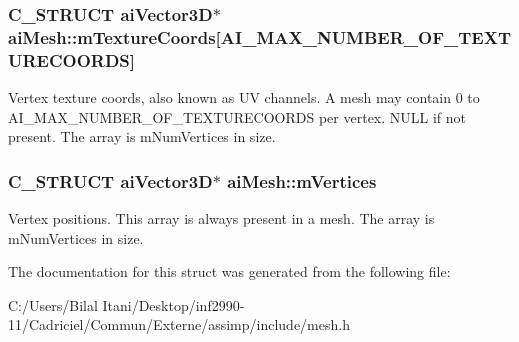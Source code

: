 \subsubsection[{\texorpdfstring{m\+Texture\+Coords}{mTextureCoords}}]{\setlength{\rightskip}{0pt plus 5cm}C\+\_\+\+S\+T\+R\+U\+CT {\bf ai\+Vector3D}$\ast$ ai\+Mesh\+::m\+Texture\+Coords\mbox{[}A\+I\+\_\+\+M\+A\+X\+\_\+\+N\+U\+M\+B\+E\+R\+\_\+\+O\+F\+\_\+\+T\+E\+X\+T\+U\+R\+E\+C\+O\+O\+R\+DS\mbox{]}}\hypertarget{structai_mesh_a4a50b11d00ef50f419c75cab0f6bddd6}{}\label{structai_mesh_a4a50b11d00ef50f419c75cab0f6bddd6}
Vertex texture coords, also known as UV channels. A mesh may contain 0 to A\+I\+\_\+\+M\+A\+X\+\_\+\+N\+U\+M\+B\+E\+R\+\_\+\+O\+F\+\_\+\+T\+E\+X\+T\+U\+R\+E\+C\+O\+O\+R\+DS per vertex. N\+U\+LL if not present. The array is m\+Num\+Vertices in size. 
\subsubsection[{\texorpdfstring{m\+Vertices}{mVertices}}]{\setlength{\rightskip}{0pt plus 5cm}C\+\_\+\+S\+T\+R\+U\+CT {\bf ai\+Vector3D}$\ast$ ai\+Mesh\+::m\+Vertices}\hypertarget{structai_mesh_afd4588abb3e1c72821ae0234a3850662}{}\label{structai_mesh_afd4588abb3e1c72821ae0234a3850662}
Vertex positions. This array is always present in a mesh. The array is m\+Num\+Vertices in size. 

The documentation for this struct was generated from the following file\+:\begin{DoxyCompactItemize}
\item 
C\+:/\+Users/\+Bilal Itani/\+Desktop/inf2990-\/11/\+Cadriciel/\+Commun/\+Externe/assimp/include/mesh.\+h\end{DoxyCompactItemize}
